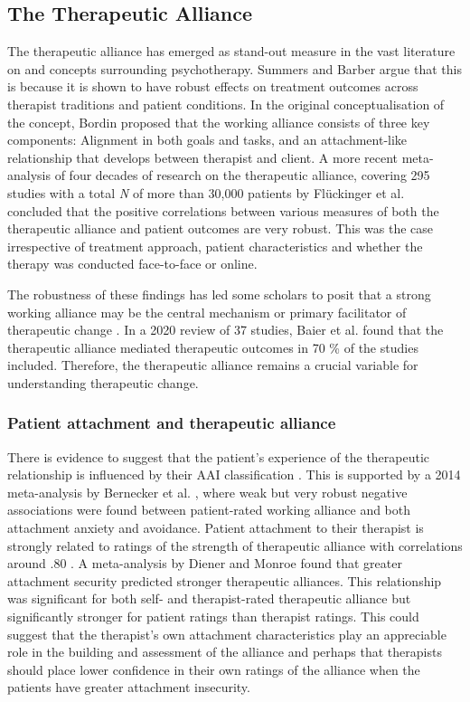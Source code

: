 \documentclass[12pt]{report}
\begin{document}
\subsection{The Therapeutic Alliance}
The therapeutic alliance has emerged as stand-out measure in the vast literature on and concepts surrounding psychotherapy.
Summers and Barber \citeyear{Summers2003} argue that this is because it is shown to have robust effects on treatment outcomes across therapist traditions and patient conditions.
In the original conceptualisation of the concept, Bordin \citeyear{Bordin1979} proposed that the working alliance consists of three key components: Alignment in both goals and tasks, and an attachment-like relationship that develops between therapist and client.
A more recent meta-analysis of four decades of research on the therapeutic alliance, covering 295 studies with a total \textit{N} of more than 30,000 patients by Flückinger et al. \citeyear{Fluckinger2018} concluded that the positive correlations between various measures of both the therapeutic alliance and patient outcomes are very robust.
This was the case irrespective of treatment approach, patient characteristics and whether the therapy was conducted face-to-face or online.

The robustness of these findings has led some scholars to posit that a strong working alliance may be the central mechanism or primary facilitator of therapeutic change \cite{RodgersCailholBuiEtAl2010}.
In a 2020 review of 37 studies, Baier et al. \citeyear{Baier2020} found that the therapeutic alliance mediated therapeutic outcomes in 70 \% of the studies included.
Therefore, the therapeutic alliance remains a crucial variable for understanding therapeutic change.

\subsubsection*{Patient attachment and therapeutic alliance}
There is evidence to suggest that the patient's experience of the therapeutic relationship is influenced by their AAI classification \cite{Talia2019}.
This is supported by a 2014 meta-analysis by Bernecker et al. \citeyear{Bernecker2014}, where weak but very robust negative associations were found between patient-rated working alliance and both attachment anxiety and avoidance.
Patient attachment to their therapist is strongly related to ratings of the strength of therapeutic alliance with correlations around .80 .
A meta-analysis by Diener and Monroe \citeyear{Diener2011} found that greater attachment security predicted stronger therapeutic alliances.
This relationship was significant for both self- and therapist-rated therapeutic alliance but significantly stronger for patient ratings than therapist ratings.
This could suggest that the therapist's own attachment characteristics play an appreciable role in the building and assessment of the alliance and perhaps that therapists should place lower confidence in their own ratings of the alliance when the patients have greater attachment insecurity.
\end{document}
